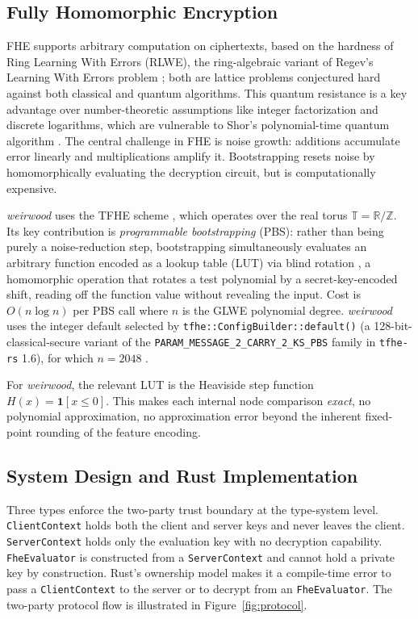 \documentclass[12pt]{article}
\begin{document}
\subsection{Fully Homomorphic Encryption}

FHE \cite{gentry} supports arbitrary computation on ciphertexts, based on the hardness of Ring Learning With Errors (RLWE), the ring-algebraic variant of Regev's Learning With Errors problem \cite{regev}; both are lattice problems conjectured hard against both classical and quantum algorithms. This quantum resistance is a key advantage over number-theoretic assumptions like integer factorization and discrete logarithms, which are vulnerable to Shor's polynomial-time quantum algorithm \cite{shor}. The central challenge in FHE is noise growth: additions accumulate error linearly and multiplications amplify it. Bootstrapping \cite{gentry} resets noise by homomorphically evaluating the decryption circuit, but is computationally expensive.

\textit{weirwood} uses the TFHE scheme \cite{tfhe}, which operates over the real torus $\mathbb{T} = \mathbb{R}/\mathbb{Z}$. Its key contribution is \textit{programmable bootstrapping} (PBS): rather than being purely a noise-reduction step, bootstrapping simultaneously evaluates an arbitrary function encoded as a lookup table (LUT) via blind rotation \cite{fhew}, a homomorphic operation that rotates a test polynomial by a secret-key-encoded shift, reading off the function value without revealing the input. Cost is $O(n \log n)$ per PBS call where $n$ is the GLWE polynomial degree. \textit{weirwood} uses the integer default selected by \texttt{tfhe::ConfigBuilder::default()} (a 128-bit-classical-secure variant of the \texttt{PARAM\_MESSAGE\_2\_CARRY\_2\_KS\_PBS} family in \texttt{tfhe-rs} 1.6), for which $n = 2048$ \cite{TFHE-rs}.

For \textit{weirwood}, the relevant LUT is the Heaviside step function $H(x) = \mathbf{1}[x \leq 0]$. This makes each internal node comparison \textit{exact}, no polynomial approximation, no approximation error beyond the inherent fixed-point rounding of the feature encoding.

\subsection{System Design and Rust Implementation}

Three types enforce the two-party trust boundary at the type-system level. \texttt{ClientContext} holds both the client and server keys and never leaves the client. \texttt{ServerContext} holds only the evaluation key with no decryption capability. \texttt{FheEvaluator} is constructed from a \texttt{ServerContext} and cannot hold a private key by construction. Rust's ownership model makes it a compile-time error to pass a \texttt{ClientContext} to the server or to decrypt from an \texttt{FheEvaluator}. The two-party protocol flow is illustrated in Figure~\ref{fig:protocol}.
\end{document}
